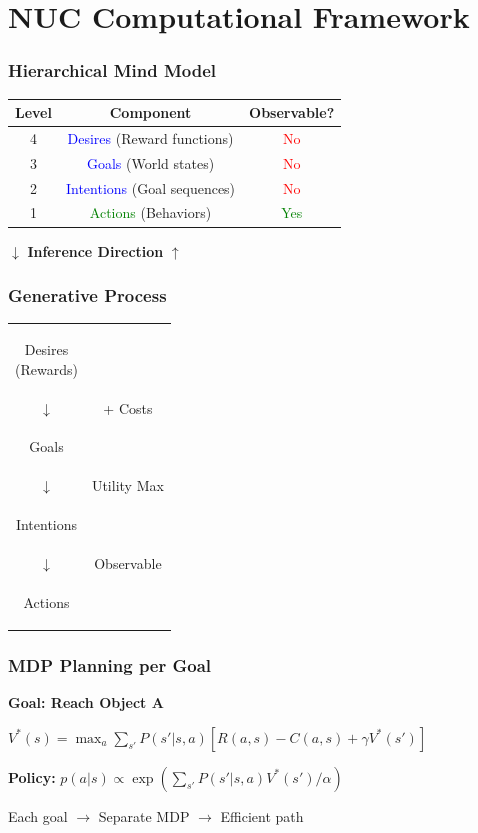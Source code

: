 \documentclass{beamer}
\begin{document}
\section{NUC Computational Framework}

\begin{frame}
\frametitle{Hierarchical Mind Model}
\begin{center}
\begin{tabular}{|c|c|c|}
\hline
\textbf{Level} & \textbf{Component} & \textbf{Observable?} \\
\hline
4 & \textcolor{blue}{Desires} (Reward functions) & \textcolor{red}{No} \\
\hline
3 & \textcolor{blue}{Goals} (World states) & \textcolor{red}{No} \\
\hline
2 & \textcolor{blue}{Intentions} (Goal sequences) & \textcolor{red}{No} \\
\hline
1 & \textcolor{green}{Actions} (Behaviors) & \textcolor{green}{Yes} \\
\hline
\end{tabular}
\end{center}

\vspace{0.5cm}
\begin{center}
\Large $\downarrow$ \textbf{Inference Direction} $\uparrow$
\end{center}
\end{frame}

\begin{frame}
\frametitle{Generative Process}
\begin{center}
\begin{tabular}{c c}
\colorbox{blue!20}{\parbox{2.5cm}{\centering Desires \\ (Rewards)}} & \\
$\downarrow$ & + Costs \\
\colorbox{green!20}{\parbox{2.5cm}{\centering Goals}} & \\
$\downarrow$ & Utility Max \\
\colorbox{yellow!20}{\parbox{2.5cm}{\centering Intentions}} & \\
$\downarrow$ & Observable \\
\colorbox{red!20}{\parbox{2.5cm}{\centering Actions}} & \\
\end{tabular}
\end{center}
\end{frame}

\begin{frame}
\frametitle{MDP Planning per Goal}
\begin{center}
\textbf{Goal: Reach Object A}

\vspace{0.3cm}
$V^*(s) = \max_a \sum_{s'} P(s'|s,a)[R(a,s) - C(a,s) + \gamma V^*(s')]$

\vspace{0.5cm}
\textbf{Policy:} $p(a|s) \propto \exp(\sum_{s'} P(s'|s,a)V^*(s')/\alpha)$

\vspace{0.5cm}
Each goal $\rightarrow$ Separate MDP $\rightarrow$ Efficient path
\end{center}
\end{frame}
\end{document}
